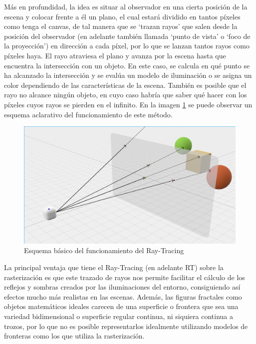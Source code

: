 Más en profundidad, la idea es situar al observador en una cierta posición de la escena y colocar frente a él un plano, el cual estará dividido en tantos píxeles como tenga el canvas, de tal manera que se `trazan rayos' que salen desde la posición del observador (en adelante también llamada `punto de vista' o `foco de la proyección') en dirección a cada píxel, por lo que se lanzan tantos rayos como píxeles haya. El rayo atraviesa el plano y avanza por la escena hasta que encuentra la intersección con un objeto. En este caso, se calcula en qué punto se ha alcanzado la intersección y se evalúa un modelo de iluminación o se asigna un color dependiendo de las características de la escena. También es posible que el rayo no alcance ningún objeto, en cuyo caso habría que saber qué hacer con los píxeles cuyos rayos se pierden en el infinito. En la imagen \ref{fig:RT} se puede observar un esquema aclarativo del funcionamiento de este método.

\begin{figure} [ht]
    \centering
    \includegraphics[scale = 0.25]{img/C7/RT.png}
    \caption{Esquema básico del funcionamiento del Ray-Tracing}
    \label{fig:RT}
\end{figure}

La principal ventaja que tiene el Ray-Tracing (en adelante RT) sobre la rasterización es que este trazado de rayos nos permite facilitar el cálculo de los reflejos y sombras creados por las iluminaciones del entorno, consiguiendo así efectos mucho más realistas en las escenas. Además, las figuras fractales como objetos matemáticos ideales carecen de una superficie o frontera que sea una variedad bidimensional o superficie regular continua, ni siquiera continua a trozos, por lo que no es posible representarlos idealmente utilizando modelos de fronteras como los que utiliza la rasterización. 

